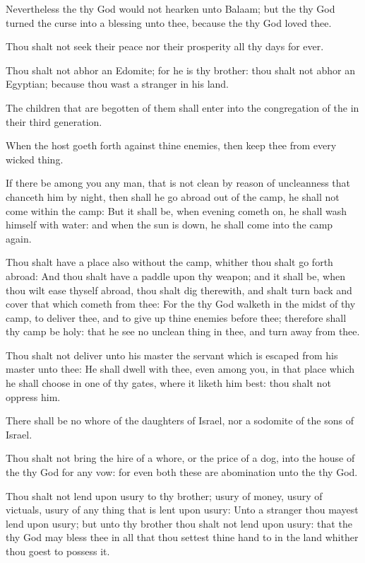 \Verse Nevertheless the \LORD thy God would not hearken unto Balaam; but the \LORD thy God turned the curse into a blessing unto thee, because the \LORD thy God loved thee.

\Verse Thou shalt not seek their peace nor their prosperity all thy days for ever.

\Verse Thou shalt not abhor an Edomite; for he is thy brother: thou shalt not abhor an Egyptian; because thou wast a stranger in his land.

\Verse The children that are begotten of them shall enter into the congregation of the \LORD in their third generation.

\Verse When the host goeth forth against thine enemies, then keep thee from every wicked thing.

\Verse If there be among you any man, that is not clean by reason of uncleanness that chanceth him by night, then shall he go abroad out of the camp, he shall not come within the camp: \Verse But it shall be, when evening cometh on, he shall wash himself with water: and when the sun is down, he shall come into the camp again.

\Verse Thou shalt have a place also without the camp, whither thou shalt go forth abroad: \Verse And thou shalt have a paddle upon thy weapon; and it shall be, when thou wilt ease thyself abroad, thou shalt dig therewith, and shalt turn back and cover that which cometh from thee: \Verse For the \LORD thy God walketh in the midst of thy camp, to deliver thee, and to give up thine enemies before thee; therefore shall thy camp be holy: that he see no unclean thing in thee, and turn away from thee.

\Verse Thou shalt not deliver unto his master the servant which is escaped from his master unto thee: \Verse He shall dwell with thee, even among you, in that place which he shall choose in one of thy gates, where it liketh him best: thou shalt not oppress him.

\Verse There shall be no whore of the daughters of Israel, nor a sodomite of the sons of Israel.

\Verse Thou shalt not bring the hire of a whore, or the price of a dog, into the house of the \LORD thy God for any vow: for even both these are abomination unto the \LORD thy God.

\Verse Thou shalt not lend upon usury to thy brother; usury of money, usury of victuals, usury of any thing that is lent upon usury: \Verse Unto a stranger thou mayest lend upon usury; but unto thy brother thou shalt not lend upon usury: that the \LORD thy God may bless thee in all that thou settest thine hand to in the land whither thou goest to possess it.

